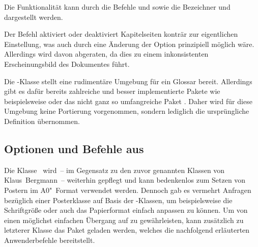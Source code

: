 \begin{DeclareEntity}{}
\begin{Declaration}
  {}
\printdeclarationlist

Die Funktionalität kann durch die Befehle  und 
 sowie die Bezeichner  und 
 dargestellt werden.
\end{Declaration}

\begin{Declaration}
  {}
\printdeclarationlist

Der Befehl aktiviert oder deaktiviert Kapitelseiten konträr zur eigentlichen 
Einstellung, was auch durch eine Änderung der Option  
prinzipiell möglich wäre. Allerdings wird davon abgeraten, da dies zu einem 
inkonsistenten Erscheinungsbild des Dokumentes führt.
\end{Declaration}

\begin{Declaration}
  {}
\begin{Declaration}
  {}
\printdeclarationlist

Die -Klasse stellt eine rudimentäre Umgebung für ein Glossar 
bereit. Allerdings gibt es dafür bereits zahlreiche und besser implementierte 
Pakete wie beispielsweise  oder das nicht ganz so 
umfangreiche Paket . Daher wird für diese Umgebung keine 
Portierung vorgenommen, sondern lediglich die ursprüngliche Definition 
übernommen.
\end{Declaration}
\end{Declaration}
%



\subsection{%
  Optionen und Befehle aus %
}

%
Die Klasse~ wird~-- im Gegensatz zu den zuvor genannten 
Klassen von Klaus~Bergmann~-- weiterhin gepflegt und kann bedenkenlos zum 
Setzen von Postern im A0"~Format verwendet werden. Dennoch gab es vermehrt 
Anfragen bezüglich einer Posterklasse auf Basis der \TUDScript-Klassen, um 
beispielsweise die Schriftgröße oder auch das Papierformat einfach anpassen zu 
können. Um von  einen möglichst einfachen Übergang auf 
 zu gewährleisten, kann zusätzlich zu letzterer Klasse das 
Paket  geladen werden, welches die nachfolgend erläuterten 
Anwenderbefehle bereitstellt.


\end{DeclareEntity}
